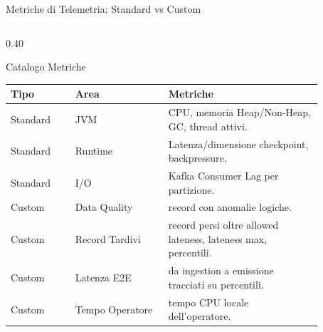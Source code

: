 \documentclass[10pt, aspectratio=169]{beamer}
\begin{document}
\begin{frame}{Metriche di Telemetria: Standard vs Custom}
    \vspace{-0.15cm}
    \begin{columns}[T,onlytextwidth]
        \begin{column}{0.40\textwidth}
            \begin{block}{\footnotesize Catalogo Metriche}
                \centering
                \renewcommand{\arraystretch}{1.16}
                \setlength{\tabcolsep}{2pt}
                \tiny
                \begin{tabular}{p{0.18\linewidth}p{0.26\linewidth}p{0.43\linewidth}}
                    \toprule
                    \textbf{Tipo} & \textbf{Area} & \textbf{Metriche} \\
                    \midrule
                    Standard & JVM & CPU, memoria Heap/Non-Heap, GC, thread attivi. \\ \hline
                    Standard & Runtime & Latenza/dimensione checkpoint, backpressure. \\ \hline
                    Standard & I/O & Kafka Consumer Lag per partizione. \\
                    \midrule[\heavyrulewidth]
                    Custom & Data Quality & record con anomalie logiche. \\ \hline
                    Custom & Record Tardivi & record persi oltre allowed lateness, lateness max, percentili. \\ \hline
                    Custom & Latenza E2E & da ingestion a emissione tracciati su percentili. \\ \hline
                    Custom & Tempo Operatore & tempo CPU locale dell'operatore. \\
                    \bottomrule
                \end{tabular}
            \end{block}
        \end{column}


\end{columns}
\end{frame}
\end{document}
